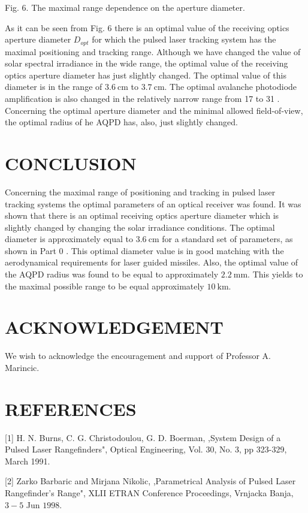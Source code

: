 \documentclass[10pt]{article}
\begin{document}
Fig. 6. The maximal range dependence on the aperture diameter.

As it can be seen from Fig. 6 there is an optimal value of the receiving optics aperture diameter \(D_{o p t}\) for which the pulsed laser tracking system has the maximal positioning and tracking range. Although we have changed the value of solar spectral irradiance in the wide range, the optimal value of the receiving optics aperture diameter has just slightly changed. The optimal value of this diameter is in the range of \(3.6 \mathrm{~cm}\) to \(3.7 \mathrm{~cm}\). The optimal avalanche photodiode amplification is also changed in the relatively narrow range from 17 to 31 . Concerning the optimal aperture diameter and the minimal allowed field-of-view, the optimal radius of he AQPD has, also, just slightly changed.

\section{CONCLUSION}
Concerning the maximal range of positioning and tracking in pulsed laser tracking systems the optimal parameters of an optical receiver was found. It was shown that there is an optimal receiving optics aperture diameter which is slightly changed by changing the solar irradiance conditions. The optimal diameter is approximately equal to \(3.6 \mathrm{~cm}\) for a standard set of parameters, as shown in Part 0 . This optimal diameter value is in good matching with the aerodynamical requirements for laser guided missiles. Also, the optimal value of the AQPD radius was found to be equal to approximately \(2.2 \mathrm{~mm}\). This yields to the maximal possible range to be equal approximately \(10 \mathrm{~km}\).

\section{ACKNOWLEDGEMENT}
We wish to acknowledge the encouragement and support of Professor A. Marincic.

\section{REFERENCES}
[1] H. N. Burns, C. G. Christodoulou, G. D. Boerman, ,System Design of a Pulsed Laser Rangefinders", Optical Engineering, Vol. 30, No. 3, pp 323-329, March 1991.

[2] Zarko Barbaric and Mirjana Nikolic, ,Parametrical Analysis of Pulsed Laser Rangefinder's Range", XLII ETRAN Conference Proceedings, Vrnjacka Banja, \(3-5\) Jun \(1998 .\)
\end{document}
